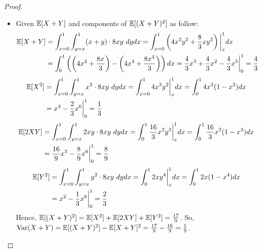 \documentclass{article}
\begin{document}
\begin{proof}
    \begin{itemize}
        \item[(a)] Given $\mathbb{E}[X+Y]$ and components of $\mathbb{E}[(X+Y)^2]$ as follow:
        \begin{align}
            \EE[X+Y] &= \int_{x=0}^{1}\int_{y=x}^{1}(x+y)\cdot 8xy\ dydx = \int_{x=0}^{1}\left(4x^2y^2 + \frac{8}{3}xy^3\right)\bigg|_{x}^{1}dx\\ 
            &= \int_{0}^{1}\left(\left(4x^2+\frac{8x}{3}\right) - \left(4x^4 + \frac{8x^4}{3}\right)\right)dx = \frac{4}{3}x^3 + \frac{4}{3}x^2 - \frac{4}{3}x^5\bigg|_{0}^{1}= \frac{4}{3}
        \end{align}
        \begin{align}
            \mathbb{E}[X^2] &= \int_{x=0}^{1}\int_{y=x}^{1}x^2\cdot 8xy\ dy dx = \int_{x=0}^{1}4x^3y^2\bigg|_{x}^{1}dx = \int_{0}^{1}4x^3(1-x^2)dx\\ 
            &= x^4 - \frac{2}{3}x^6\bigg|_{0}^{1} = \frac{1}{3}
        \end{align}
        \begin{align}
            \EE[2XY] &= \int_{x=0}^{1}\int_{y=x}^{1}2xy \cdot 8xy\ dy dx = \int_{0}^{1}\frac{16}{3}x^2y^3\bigg|_{x}^{1}dx = \int_{0}^{1}\frac{16}{3}x^2(1-x^3)dx \\
            &= \frac{16}{9}x^3 - \frac{8}{9}x^6\bigg|_{0}^{1} = \frac{8}{9}
        \end{align}
        \begin{align}
            \EE[Y^2] &= \int_{x=0}^{1}\int_{y=x}^{1}y^2\cdot 8xy\ dydx = \int_{0}^{1}2xy^4\bigg|_{x}^{1}dx = \int_{0}^{1}2x(1-x^4)dx\\
            &= x^2 - \frac{1}{3}x^6\bigg|_{0}^{1} = \frac{2}{3}
        \end{align}
        Hence, $\mathbb{E}[(X+Y)^2]= \mathbb{E}[X^2]+\mathbb{E}[2XY]+\mathbb{E}[Y^2] = \frac{17}{9}$. So, $\mathrm{Var}(X+Y) = \mathbb{E}[(X+Y)^2]-\mathbb{E}[X+Y]^2 = \frac{17}{9}- \frac{16}{9}=\frac{1}{9}$.
        
        \hfil


\end{itemize}
\end{proof}
\end{document}
